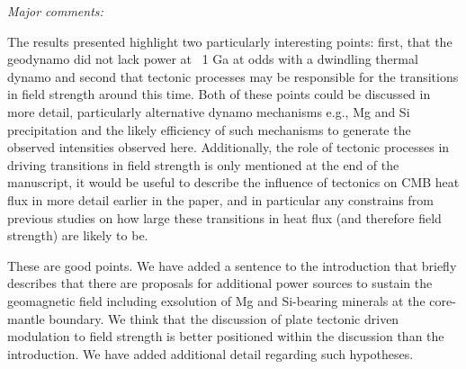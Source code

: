 \documentclass[11pt, letterpaper]{article}
\begin{document}
\begin{flushleft}
\itshape
Major comments:

The results presented highlight two particularly interesting points: first, that the geodynamo did not lack power at ~1 Ga at odds with a dwindling thermal dynamo and second that tectonic processes may be responsible for the transitions in field strength around this time. Both of these points could be discussed in more detail, particularly alternative dynamo mechanisms e.g., Mg and Si precipitation and the likely efficiency of such mechanisms to generate the observed intensities observed here. Additionally, the role of tectonic processes in driving transitions in field strength is only mentioned at the end of the manuscript, it would be useful to describe the influence of tectonics on CMB heat flux in more detail earlier in the paper, and in particular any constrains from previous studies on how large these transitions in heat flux (and therefore field strength) are likely to be.
\upshape

These are good points. We have added a sentence to the introduction that briefly describes that there are proposals for additional power sources to sustain the geomagnetic field including exsolution of Mg and Si-bearing minerals at the core-mantle boundary. We think that the discussion of plate tectonic driven modulation to field strength is better positioned within the discussion than the introduction. We have added additional detail regarding such hypotheses.



\end{flushleft}
\end{document}
